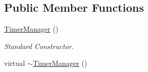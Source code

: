 \subsection*{Public Member Functions}
\begin{DoxyCompactItemize}
\item 
\hypertarget{classphys_1_1TimerManager_a53e30a8cb528de39ac94937781b96d39}{
\hyperlink{classphys_1_1TimerManager_a53e30a8cb528de39ac94937781b96d39}{TimerManager} ()}
\label{dc/d66/classphys_1_1TimerManager_a53e30a8cb528de39ac94937781b96d39}

\begin{DoxyCompactList}\small\item\em Standard Constructor. \item\end{DoxyCompactList}\item 
\hypertarget{classphys_1_1TimerManager_a75bcaca5c292ecfb62ad46a6156b7d87}{
virtual \hyperlink{classphys_1_1TimerManager_a75bcaca5c292ecfb62ad46a6156b7d87}{$\sim$TimerManager} ()}
\label{dc/d66/classphys_1_1TimerManager_a75bcaca5c292ecfb62ad46a6156b7d87}


\end{DoxyCompactItemize}
